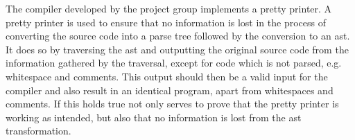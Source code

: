 The compiler developed by the project group implements a pretty printer.
A pretty printer is used to ensure that no information is lost in the process of converting the source code into a parse tree followed by the conversion to an \acrshort{ast}.
It does so by traversing the \acrshort{ast} and outputting the original source code from the information gathered by the traversal, except for code which is not parsed, e.g. whitespace and comments.
This output should then be a valid input for the compiler and also result in an identical program, apart from whitespaces and comments.
If this holds true not only serves to prove that the pretty printer is working as intended, but also that no information is lost from the \acrshort{ast} transformation.